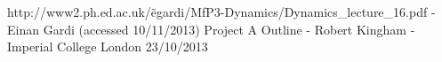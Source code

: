 \documentclass[11pt]{article}
\begin{document}

\newpage

\begin{thebibliography}{10}
 http://www2.ph.ed.ac.uk/\~egardi/MfP3-Dynamics/Dynamics\_lecture\_16.pdf - Einan Gardi (accessed 10/11/2013)
 Project A Outline - Robert Kingham - Imperial College London 23/10/2013
\end{thebibliography}
\end{document}

